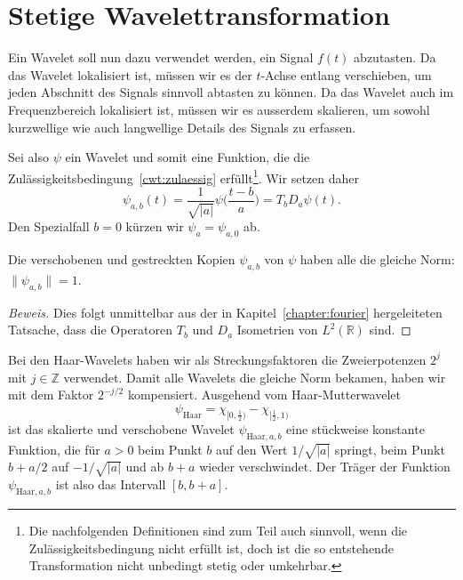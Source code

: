 %
%
%
\section{Stetige Wavelettransformation
\label{sextion:cwt}}
Ein Wavelet soll nun dazu verwendet werden, ein Signal $f(t)$ abzutasten.
Da das Wavelet lokalisiert ist, müssen wir es der $t$-Achse entlang
verschieben, um jeden Abschnitt des Signals sinnvoll abtasten zu
können.
Da das Wavelet auch im Frequenzbereich lokalisiert ist, müssen wir
es ausserdem skalieren, um sowohl kurzwellige wie auch langwellige
Details des Signals zu erfassen.

Sei also $\psi$ ein Wavelet und somit eine Funktion, die die
Zulässigkeitsbedingung~\eqref{cwt:zulaessig} erfüllt\footnote{Die nachfolgenden
Definitionen sind zum Teil auch sinnvoll, wenn die Zulässigkeitsbedingung
nicht erfüllt ist, doch ist die so entstehende Transformation nicht unbedingt
stetig oder umkehrbar.}.
Wir setzen daher
\[
\psi_{a,b}(t)
=
\frac{1}{\sqrt{|a|}} \psi\biggl(\frac{t-b}a\biggr)
=
T_bD_a\psi (t).
\]
Den Spezialfall $b=0$ kürzen wir $\psi_a = \psi_{a,0}$ ab.

\begin{lemma}
Die verschobenen und gestreckten Kopien $\psi_{a,b}$ von $\psi$ haben alle
die gleiche Norm: $\|\psi_{a,b}\|=1$.
\end{lemma}

\begin{proof}[Beweis]
Dies folgt unmittelbar aus der in Kapitel~\ref{chapter:fourier}
hergeleiteten Tatsache, dass die Operatoren $T_b$ und $D_a$
Isometrien von $L^2(\mathbb R)$ sind.
\end{proof}

\begin{beispiel}
Bei den Haar-Wavelets haben wir als Streckungsfaktoren die Zweierpotenzen
$2^j$ mit $j\in\mathbb Z$ verwendet.
Damit alle Wavelets die gleiche Norm bekamen, haben wir mit dem Faktor
$2^{-j/2}$ kompensiert.
Ausgehend vom Haar-Mutterwavelet
\[
\psi_{\text{Haar}} = \chi_{[0,\frac12)} - \chi_{[\frac12,1)}
\]
ist das skalierte und verschobene Wavelet
$\psi_{\text{Haar},a,b}$ eine stückweise konstante Funktion,
die für $a>0$ beim Punkt $b$ auf den Wert $1/\sqrt{|a|}$ springt,
beim Punkt $b+a/2$ auf $-1/\sqrt{|a|}$ und ab $b+a$ wieder verschwindet.
Der Träger der Funktion $\psi_{\text{Haar},a,b}$ ist also das Intervall
$[b,b+a]$.
\end{beispiel}


